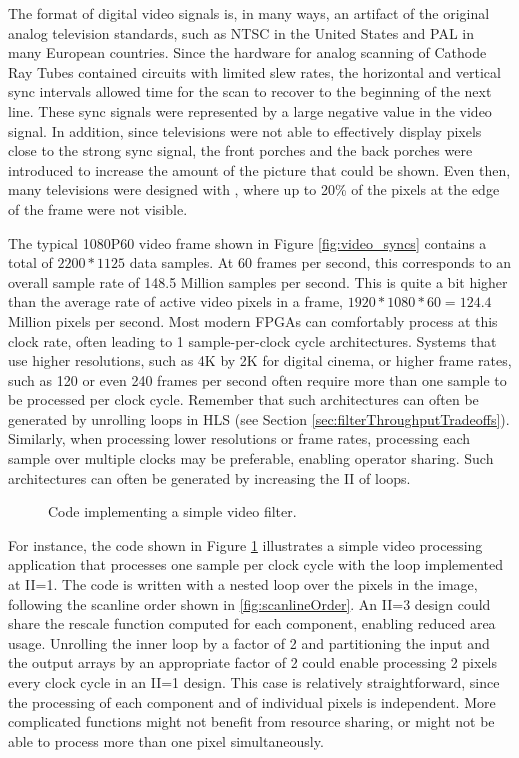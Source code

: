 \begin{aside}
The format of digital video signals is, in many ways, an artifact of the original analog television standards, such as NTSC in the United States and PAL in many European countries.  Since the hardware for analog scanning of Cathode Ray Tubes contained  circuits with limited slew rates, the horizontal and vertical sync intervals allowed time for the scan to recover to the beginning of the next line.  These sync signals were represented by a large negative value in the video signal.  In addition, since televisions were not able to effectively display pixels close to the strong sync signal, the front porches and the back porches were introduced to increase the amount of the picture that could be shown.  Even then, many televisions were designed with , where up to 20\% of the pixels at the edge of the frame were not visible.
\end{aside}

The typical 1080P60 video frame shown in Figure \ref{fig:video_syncs} contains a total of $2200*1125$ data samples.  At 60 frames per second, this corresponds to an overall sample rate of 148.5 Million samples per second.   This is quite a bit higher than the average rate of active video pixels in a frame, $1920*1080*60 = 124.4$ Million pixels per second. Most modern FPGAs can comfortably process at this clock rate, often leading to 1 sample-per-clock cycle architectures.  Systems that use higher resolutions, such as 4K by 2K for digital cinema, or higher frame rates, such as 120 or even 240 frames per second often require more than one sample to be processed per clock cycle. Remember that such architectures can often be generated by unrolling loops in HLS (see Section \ref{sec:filterThroughputTradeoffs}).  Similarly, when processing lower resolutions or frame rates, processing each sample over multiple clocks may be preferable, enabling operator sharing.  Such architectures can often be generated by increasing the II of loops. %

\begin{figure}

\caption{Code implementing a simple video filter.}\label{fig:videoSimple}
\end{figure}

For instance, the code shown in Figure \ref{fig:videoSimple} illustrates a simple video processing application that processes one sample per clock cycle with the loop implemented at II=1.  The code is written with a nested loop over the pixels in the image, following the scanline order shown in \ref{fig:scanlineOrder}.  An II=3 design could share the rescale function computed for each component, enabling reduced area usage.  Unrolling the inner loop by a factor of 2 and partitioning the input and the output arrays by an appropriate factor of 2 could enable processing 2 pixels every clock cycle in an II=1 design.  This case is relatively straightforward, since the processing of each component and of individual pixels is independent.  More complicated functions might not benefit from resource sharing, or might not be able to process more than one pixel simultaneously.

